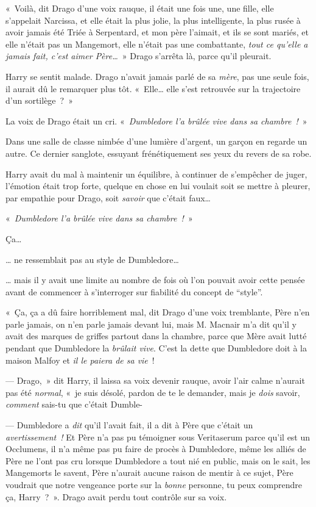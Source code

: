 «~Voilà, dit Drago d'une voix rauque, il était une fois une, une fille, elle s'appelait Narcissa, et elle était la plus jolie, la plus intelligente, la plus rusée à avoir jamais été Triée à Serpentard, et mon père l'aimait, et ils se sont mariés, et elle n'était pas un Mangemort, elle n'était pas une combattante, \emph{tout ce qu'elle a jamais fait, c'est aimer Père…}~» Drago s'arrêta là, parce qu'il pleurait.

Harry se sentit malade. Drago n'avait jamais parlé de sa \emph{mère}, pas une seule fois, il aurait dû le remarquer plus tôt. «~Elle… elle s'est retrouvée sur la trajectoire d'un sortilège~?~»

La voix de Drago était un cri. «~\emph{Dumbledore l'a brûlée vive dans sa chambre~!}~»

\later

Dans une salle de classe nimbée d'une lumière d'argent, un garçon en regarde un autre. Ce dernier sanglote, essuyant frénétiquement ses yeux du revers de sa robe.

Harry avait du mal à maintenir un équilibre, à continuer de s'empêcher de juger, l'émotion était trop forte, quelque en chose en lui voulait soit se mettre à pleurer, par empathie pour Drago, soit \emph{savoir} que c'était faux…

«~\emph{Dumbledore l'a brûlée vive dans sa chambre~!}~»

Ça…

… ne ressemblait pas au style de Dumbledore…

… mais il y avait une limite au nombre de fois où l'on pouvait avoir cette pensée avant de commencer à s'interroger sur fiabilité du concept de “style”.

«~Ça, ça a dû faire horriblement mal, dit Drago d'une voix tremblante, Père n'en parle jamais, on n'en parle jamais devant lui, mais M. Macnair m'a dit qu'il y avait des marques de griffes partout dans la chambre, parce que Mère avait lutté pendant que Dumbledore la \emph{brûlait vive}. C'est la dette que Dumbledore doit à la maison Malfoy et \emph{il le paiera de sa vie}~!

--- Drago,~» dit Harry, il laissa sa voix devenir rauque, avoir l'air calme n'aurait pas été \emph{normal}, «~je suis désolé, pardon de te le demander, mais je \emph{dois} savoir, \emph{comment} sais-tu que c'était Dumble-

--- Dumbledore a \emph{dit} qu'il l'avait fait, il a dit à Père que c'était un \emph{avertissement~!} Et Père n'a pas pu témoigner sous Veritaserum parce qu'il est un Occlumens, il n'a même pas pu faire de procès à Dumbledore, même les alliés de Père ne l'ont pas cru lorsque Dumbledore a tout nié en public, mais on le sait, les Mangemorts le savent, Père n'aurait aucune raison de mentir à ce sujet, Père voudrait que notre vengeance porte sur la \emph{bonne} personne, tu peux comprendre ça, Harry~?~». Drago avait perdu tout contrôle sur sa voix.


